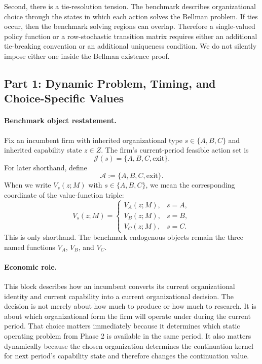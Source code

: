 Second, there is a tie-resolution tension. The benchmark describes organizational choice through the states in which each action solves the Bellman problem. If ties occur, then the benchmark solving regions can overlap. Therefore a single-valued policy function or a row-stochastic transition matrix requires either an additional tie-breaking convention or an additional uniqueness condition. We do not silently impose either one inside the Bellman existence proof.

\subsection{Part 1: Dynamic Problem, Timing, and Choice-Specific Values}

\paragraph{Benchmark object restatement.}
Fix an incumbent firm with inherited organizational type $s\in\{A,B,C\}$ and inherited capability state $z\in Z$. The firm's current-period feasible action set is
\[
\mathcal J(s)=\{A,B,C,\mathrm{exit}\}.
\]
For later shorthand, define
\[
\mathcal A:=\{A,B,C,\mathrm{exit}\}.
\]
When we write $V_s(z;M)$ with $s\in\{A,B,C\}$, we mean the corresponding coordinate of the value-function triple:
\[
V_s(z;M)=
\begin{cases}
V_A(z;M), & s=A,\\
V_B(z;M), & s=B,\\
V_C(z;M), & s=C.
\end{cases}
\]
This is only shorthand. The benchmark endogenous objects remain the three named functions $V_A$, $V_B$, and $V_C$.

\paragraph{Economic role.}
This block describes how an incumbent converts its current organizational identity and current capability into a current organizational decision. The decision is not merely about how much to produce or how much to research. It is about which organizational form the firm will operate under during the current period. That choice matters immediately because it determines which static operating problem from Phase 2 is available in the same period. It also matters dynamically because the chosen organization determines the continuation kernel for next period's capability state and therefore changes the continuation value.

